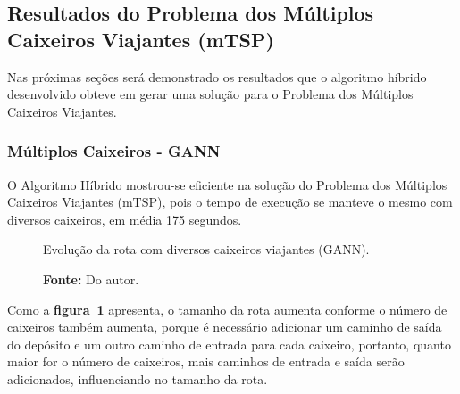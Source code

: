 \documentclass[12pt,openright,a4paper,oneside]{tcc}
\begin{document}
        \newpage
		\subsection{Resultados do Problema dos Múltiplos Caixeiros Viajantes (mTSP)}	

        Nas próximas seções será demonstrado os resultados que o algoritmo híbrido desenvolvido obteve em gerar uma solução para o Problema dos Múltiplos Caixeiros Viajantes.

		\subsubsection{Múltiplos Caixeiros - GANN}
		
		O Algoritmo Híbrido mostrou-se eficiente na solução do Problema dos Múltiplos Caixeiros Viajantes (mTSP), pois o tempo de execução se manteve o mesmo com diversos caixeiros, em média 175 segundos.

		\begin{figure}[h]
			\centering
            \caption{Evolução da rota com diversos caixeiros viajantes (GANN).}
			\caption*{\textbf{Fonte:} Do autor.}
			\label{figmult}
		\end{figure}

        Como a \textbf{figura~\ref{figmult}} apresenta, o tamanho da rota aumenta conforme o número de caixeiros também aumenta, porque é necessário adicionar um caminho de saída do depósito e um outro caminho de entrada para cada caixeiro, portanto, quanto maior for o número de caixeiros, mais caminhos de entrada e saída serão adicionados, influenciando no tamanho da rota.
\end{document}
